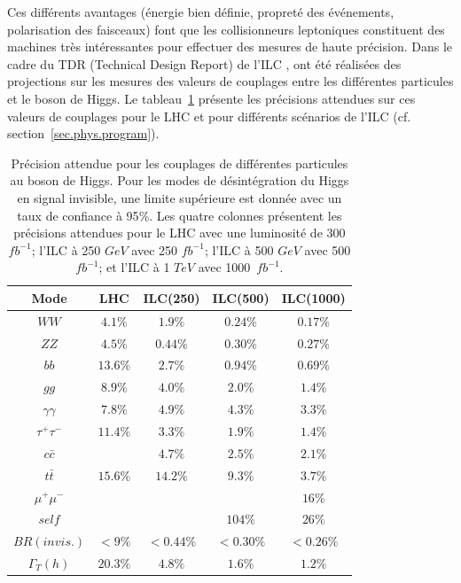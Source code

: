 Ces différents avantages (énergie bien définie, propreté des événements, polarisation des faisceaux) font que les collisionneurs leptoniques constituent des machines très intéressantes pour effectuer des mesures de haute précision. Dans le cadre du TDR (Technical Design Report) de l'ILC \cite{physicsTDR}, ont été réalisées des projections sur les mesures des valeurs de couplages entre les différentes particules et le boson de Higgs. Le tableau~\ref{tab.higgs-coupling} présente les précisions attendues sur ces valeurs de couplages pour le LHC et pour différents scénarios de l'ILC (cf. section~\ref{sec.phys.program}). 
\begin{table}[!ht]
  \begin{center}
    \begin{tabular}{c|c|c|c|c}
      \rowcolor{black!20!white} Mode & LHC & ILC(250) & ILC(500) & ILC(1000)\\
      \hline
      \rowcolor{black!5!white}$WW$ & $4.1\%$ & $1.9\%$ & $0.24\%$ & $0.17\%$ \\
      \rowcolor{black!5!white}$ZZ$ & $4.5\%$ & $0.44\%$ & $0.30\%$ & $0.27\%$ \\
      \rowcolor{black!5!white}$bb$ & $13.6\%$ & $2.7\%$ & $0.94\%$ & $0.69\%$ \\
      \rowcolor{black!5!white}$gg$ & $8.9\%$ & $4.0\%$ & $2.0\%$ & $1.4\%$ \\
      \rowcolor{black!5!white}$\gamma\gamma$ & $7.8\%$ & $4.9\%$ & $4.3\%$ & $3.3\%$ \\
      \rowcolor{black!5!white}$\tau^+\tau^-$ & $11.4\%$ & $3.3\%$ & $1.9\%$ & $1.4\%$ \\
      \rowcolor{black!5!white}$c\bar c$ & $ $ & $4.7\%$ & $2.5\%$ & $2.1\%$ \\
      \rowcolor{black!5!white}$t\bar t$ & $15.6\%$ & $14.2\%$ & $9.3\%$ & $3.7\%$ \\
      \rowcolor{black!5!white}$\mu^+\mu^-$ & $ $ & $ $ & $ $ & $16\%$ \\
      \rowcolor{black!5!white}$self$ & $ $ & $ $ & $104\%$ & $26\%$ \\
      \hline
      \rowcolor{black!5!white}$BR(invis.)$ & $< 9\%$ & $< 0.44\%$ & $< 0.30\%$ & $< 0.26\%$ \\
      \rowcolor{black!5!white}$\Gamma_T (h)$ & $20.3\%$ & $4.8\%$ & $1.6\%$ & $1.2\%$ \\
    \end{tabular}
  \end{center}  
  \caption{Précision attendue pour les couplages de différentes particules au boson de Higgs. Pour les modes de désintégration du Higgs en signal invisible, une limite supérieure est donnée avec un taux de confiance à 95$\%$. Les quatre colonnes présentent les précisions attendues pour le LHC avec une luminosité de 300 $fb^{-1}$; l'ILC à 250 $GeV$ avec 250 $fb^{-1}$; l'ILC à 500 $GeV$ avec 500 $fb^{-1}$; et l'ILC à 1 $TeV$ avec 1000~$fb^{-1}$.}
  \label{tab.higgs-coupling}
\end{table}
